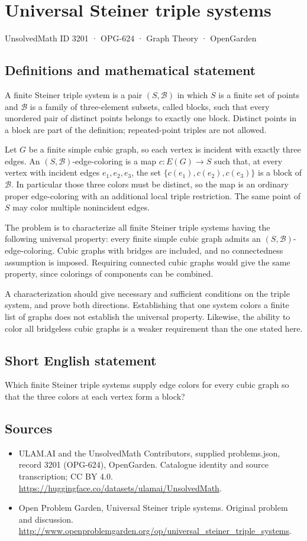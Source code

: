 \documentclass[11pt,a4paper]{article}
\begin{document}
\section*{Universal Steiner triple systems}\label{3201}
{\small UnsolvedMath ID 3201 · OPG-624 · Graph Theory · OpenGarden}
\subsection{Definitions and mathematical statement}
A finite Steiner triple system is a pair $(S,\mathcal B)$ in which $S$ is a finite set of points and $\mathcal B$ is a family of three-element subsets, called blocks, such that every unordered pair of distinct points belongs to exactly one block. Distinct points in a block are part of the definition; repeated-point triples are not allowed.

Let $G$ be a finite simple cubic graph, so each vertex is incident with exactly three edges. An $(S,\mathcal B)$-edge-coloring is a map $c:E(G)\to S$ such that, at every vertex with incident edges $e_1,e_2,e_3$, the set $\{c(e_1),c(e_2),c(e_3)\}$ is a block of $\mathcal B$. In particular those three colors must be distinct, so the map is an ordinary proper edge-coloring with an additional local triple restriction. The same point of $S$ may color multiple nonincident edges.

The problem is to characterize all finite Steiner triple systems having the following universal property: every finite simple cubic graph admits an $(S,\mathcal B)$-edge-coloring. Cubic graphs with bridges are included, and no connectedness assumption is imposed. Requiring connected cubic graphs would give the same property, since colorings of components can be combined.

A characterization should give necessary and sufficient conditions on the triple system, and prove both directions. Establishing that one system colors a finite list of graphs does not establish the universal property. Likewise, the ability to color all bridgeless cubic graphs is a weaker requirement than the one stated here.
\subsection{Short English statement}
Which finite Steiner triple systems supply edge colors for every cubic graph so that the three colors at each vertex form a block?
\subsection{Sources}
\begin{itemize}
\item[S1] ULAM.AI and the UnsolvedMath Contributors, supplied problems.json, record 3201 (OPG-624), OpenGarden. Catalogue identity and source transcription; CC BY 4.0.
\url{https://huggingface.co/datasets/ulamai/UnsolvedMath}.
\item[S2] Open Problem Garden, Universal Steiner triple systems. Original problem and discussion.
\url{http://www.openproblemgarden.org/op/universal_steiner_triple_systems}.
\end{itemize}
\end{document}
